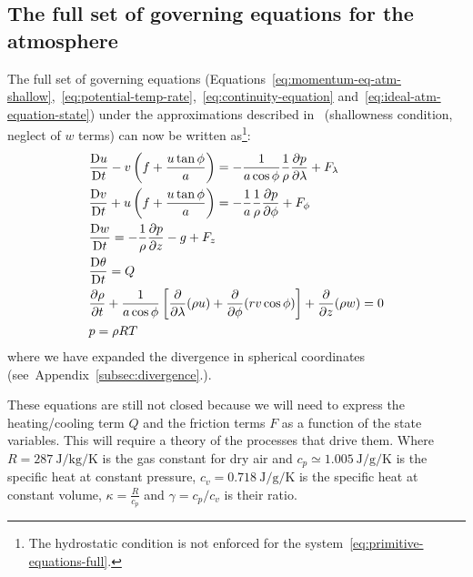\subsection{The full set of governing equations for the atmosphere}
\label{subsec:governing-eqs-atm}

The full set of governing equations (Equations~\ref{eq:momentum-eq-atm-shallow},~\ref{eq:potential-temp-rate},~\ref{eq:continuity-equation} and~\ref{eq:ideal-atm-equation-state})
under the approximations described in~\secref{\ref{subsec:momentum-equation-atm}}
(shallowness condition, neglect of $w$ terms) can now be written as\footnote{The hydrostatic condition is not enforced
	for the system~\ref{eq:primitive-equations-full}.}:
\begin{subequations}
	\begin{align}
		 & \frac{\mathrm{D} u}{\mathrm{D}t} - v\left(f +  \frac{u \tan{\phi}}{a}\right)  = -\frac{1}{ a \cos{\phi}}\frac{1}{\rho}\frac{\partial p}{\partial \lambda}   + F_\lambda                                                      \\
		 & \frac{\mathrm{D} v}{\mathrm{D}t} + u\left( f + \frac{u \tan{\phi}}{a}\right)  = -\frac{1}{a}\frac{1}{\rho}\frac{\partial p}{\partial \phi}  + F_\phi                                                                         \\
		 & \frac{\mathrm{D} w}{\mathrm{D}t}  = -\frac{1}{\rho }\frac{\partial p}{\partial z} -g  + F_z \label{Eq:PrimEq}                                                                                                                \\
		 & \frac{\mathrm{D} \theta}{\mathrm{D}t} = Q                                                                                                                                                                                    \\
		 & \frac{\partial \rho}{\partial t}+\frac{1}{a\cos{\phi}}\left[ \frac{\partial }{\partial \lambda}(\rho u) + \frac{\partial }{\partial \phi}(rv\cos{\phi} )\right] +\frac{\partial }{\partial z}(\rho w) = 0 \\
		 & p = \rho R T
	\end{align}
	\label{eq:primitive-equations-full}
\end{subequations}
where we have expanded the divergence in spherical coordinates (see~Appendix~\ref{subsec:divergence}.).

These equations are still not closed because we will need to express the heating/cooling term \(Q\) and the friction terms \(F\)
as a function of the state variables.
This will require a theory of the processes that drive them.
Where \(R= \qty{287}{\joule \per\kilo\gram \per \kelvin}\) is the gas constant for dry air and
\(c_p \simeq \qty{1.005}{\joule \per \gram \per \kelvin}\) is the specific heat at constant pressure, \(c_v = \qty{0.718}{\joule \per \gram \per \kelvin}\) is the specific heat at constant volume, \(\kappa = \frac{R}{c_p}\) and \(\gamma=c_p/c_v\) is their ratio.

